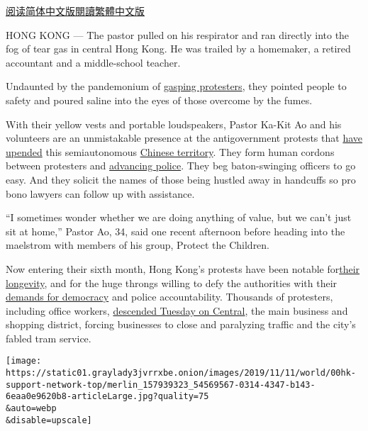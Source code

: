 \href{https://cn.nytimes3xbfgragh.onion/china/20191112/hong-kong-protests-volunteer/}{阅读简体中文版}\href{https://cn.nytimes3xbfgragh.onion/china/20191112/hong-kong-protests-volunteer/zh-hant/}{閱讀繁體中文版}

HONG KONG --- The pastor pulled on his respirator and ran directly into
the fog of tear gas in central Hong Kong. He was trailed by a homemaker,
a retired accountant and a middle-school teacher.

Undaunted by the pandemonium of
\href{https://www.nytimes3xbfgragh.onion/2019/10/27/world/asia/hong-kong-protests-test-china.html}{gasping
protesters}, they pointed people to safety and poured saline into the
eyes of those overcome by the fumes.

With their yellow vests and portable loudspeakers, Pastor Ka-Kit Ao and
his volunteers are an unmistakable presence at the antigovernment
protests that
\href{https://www.nytimes3xbfgragh.onion/2019/10/31/world/asia/hong-kong-protests.html}{have
upended} this semiautonomous
\href{https://www.nytimes3xbfgragh.onion/2019/11/06/world/asia/hong-kong-protests-china-national-security.html}{Chinese
territory}. They form human cordons between protesters and
\href{https://www.nytimes3xbfgragh.onion/2019/10/03/world/asia/hong-kong-protests-police.html}{advancing
police}. They beg baton-swinging officers to go easy. And they solicit
the names of those being hustled away in handcuffs so pro bono lawyers
can follow up with assistance.

``I sometimes wonder whether we are doing anything of value, but we
can't just sit at home,'' Pastor Ao, 34, said one recent afternoon
before heading into the maelstrom with members of his group, Protect the
Children.

Now entering their sixth month, Hong Kong's protests have been notable
for\href{https://www.nytimes3xbfgragh.onion/interactive/2019/world/asia/hong-kong-protests-arc.html}{their
longevity}, and for the huge throngs willing to defy the authorities
with their
\href{https://www.nytimes3xbfgragh.onion/2019/11/25/world/asia/hong-kong-election-protests.html}{demands
for democracy} and police accountability. Thousands of protesters,
including office workers,
\href{https://www.nytimes3xbfgragh.onion/2019/11/11/world/asia/hong-kong-protests-shooting.html}{descended
Tuesday on Central}, the main business and shopping district, forcing
businesses to close and paralyzing traffic and the city's fabled tram
service.

\texttt{[image: https://static01.graylady3jvrrxbe.onion/images/2019/11/11/world/00hk-support-network-top/merlin\_157939323\_54569567-0314-4347-b143-6eaa0e9620b8-articleLarge.jpg?quality=75\\\&auto=webp\\\&disable=upscale]}

